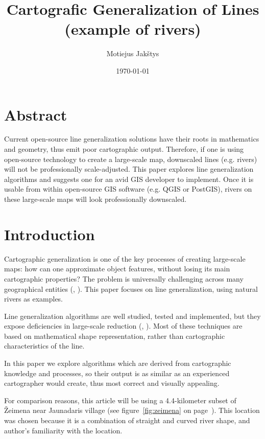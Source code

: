 \documentclass{article}
\title{
    Cartografic Generalization of Lines \\
    (example of rivers) \\ \vspace{4mm}
}
\author{Motiejus Jakštys}
\date{\today}
\begin{document}
\maketitle

\newpage

\section{Abstract}
\label{sec:abstract}

Current open-source line generalization solutions have their roots in
mathematics and geometry, thus emit poor cartographic output. Therefore, if one
is using open-source technology to create a large-scale map, downscaled lines
(e.g. rivers) will not be professionally scale-adjusted. This paper explores
line generalization algorithms and suggests one for an avid GIS developer to
implement. Once it is usable from within open-source GIS software (e.g. QGIS or
PostGIS), rivers on these large-scale maps will look professionally downscaled.

\section{Introduction}
\label{sec:introduction}

Cartographic generalization is one of the key processes of creating large-scale
maps: how can one approximate object features, without losing its main
cartographic properties? The problem is universally challenging across many
geographical entities (\cite{muller1991generalization},
\cite{mcmaster1992generalization}). This paper focuses on line generalization,
using natural rivers as examples.

Line generalization algorithms are well studied, tested and implemented, but
they expose deficiencies in large-scale reduction (\cite{monmonier1986toward},
\cite{mcmaster1993spatial}). Most of these techniques are based on mathematical
shape representation, rather than cartographic characteristics of the line.

In this paper we explore algorithms which are derived from cartographic
knowledge and processes, so their output is as similar as an experienced
cartographer would create, thus most correct and visually appealing.

For comparison reasons, this article will be using a 4.4-kilometer subset of
Žeimena near Jaunadaris village (see figure~\ref{fig:zeimena} on
page~\pageref{fig:zeimena}). This location was chosen because it is a combination
of straight and curved river shape, and author's familiarity with the location.
\end{document}

